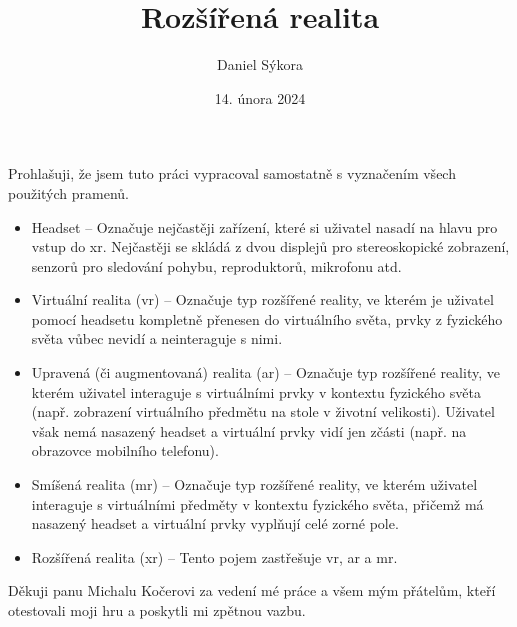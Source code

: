 \documentclass[12pt]{report}
\author{Daniel Sýkora}
\title{Rozšířená realita}
\date{14. února 2024}
\begin{document}
\mytitlepage
\prohlaseni
{
	Prohlašuji, že jsem tuto práci vypracoval samostatně s vyznačením všech použitých pramenů.
}
\abstrakt
{ %
	\lipsum[1]
}
{ %
	\begin{itemize}
		\item Headset -- Označuje nejčastěji zařízení, které si uživatel nasadí na hlavu pro vstup do \gls{xr}.
				Nejčastěji se skládá z dvou displejů pro stereoskopické zobrazení, senzorů pro sledování pohybu,
				reproduktorů, mikrofonu atd.

		\item Virtuální realita (\gls{vr}) -- Označuje typ rozšířené reality, ve kterém je uživatel pomocí headsetu
				kompletně přenesen do virtuálního světa, prvky z fyzického světa vůbec nevidí a neinteraguje s nimi.

		\item Upravená (či augmentovaná) realita (\gls{ar}) -- Označuje typ rozšířené reality, ve kterém uživatel interaguje
				s virtuálními prvky v kontextu fyzického světa (např. zobrazení virtuálního předmětu na stole v životní velikosti).
				Uživatel však nemá nasazený headset a virtuální prvky vidí jen zčásti (např. na obrazovce mobilního telefonu).

		\item Smíšená realita (\gls{mr}) -- Označuje typ rozšířené reality, ve kterém uživatel interaguje s virtuálními předměty
				v kontextu fyzického světa, přičemž má nasazený headset a virtuální prvky vyplňují celé zorné pole.

		\item Rozšířená realita (\gls{xr}) -- Tento pojem zastřešuje \gls{vr}, \gls{ar} a \gls{mr}.
	\end{itemize}
}
\podekovani
{
	Děkuji panu Michalu Kočerovi za vedení mé práce a všem mým přátelům, kteří otestovali moji hru a poskytli mi zpětnou vazbu.
}

\tableofcontents
\newpage






\nocite{*}

\appendix
{}

\printbibliography
{}

\printglossary[title={Zkratky}]

\listoffigures
{}
\end{document}
